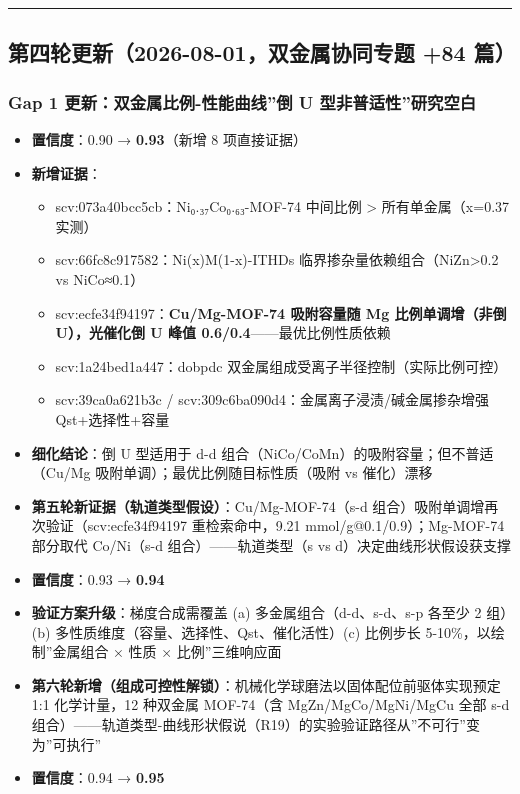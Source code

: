 \documentclass[12pt,a4paper]{ctexart}
\providecommand{\tightlist}{%
  \setlength{\itemsep}{0pt}\setlength{\parskip}{0pt}}
\begin{document}
\begin{center}\rule{0.5\linewidth}{0.5pt}\end{center}

\subsection{第四轮更新（2026-08-01，双金属协同专题 +84 篇）}\label{gap:ux7b2cux56dbux8f6eux66f4ux65b02026-08-01ux53ccux91d1ux5c5eux534fux540cux4e13ux9898-84-ux7bc7}

\subsubsection{Gap 1 更新：双金属比例-性能曲线''倒 U 型非普适性''研究空白}\label{gap:gap-1-ux66f4ux65b0ux53ccux91d1ux5c5eux6bd4ux4f8b-ux6027ux80fdux66f2ux7ebfux5012-u-ux578bux975eux666eux9002ux6027ux7814ux7a76ux7a7aux767d}

\begin{itemize}
\tightlist
\item
  \textbf{置信度}：0.90 → \textbf{0.93}（新增 8 项直接证据）
\item
  \textbf{新增证据}：

  \begin{itemize}
  \tightlist
  \item
    scv:073a40bcc5cb：Ni₀.₃₇Co₀.₆₃-MOF-74 中间比例 \textgreater{} 所有单金属（x=0.37 实测）
  \item
    scv:66fc8c917582：Ni(x)M(1-x)-ITHDs 临界掺杂量依赖组合（NiZn\textgreater0.2 vs NiCo≈0.1）
  \item
    scv:ecfe34f94197：\textbf{Cu/Mg-MOF-74 吸附容量随 Mg 比例单调增（非倒 U），光催化倒 U 峰值 0.6/0.4}------最优比例性质依赖
  \item
    scv:1a24bed1a447：dobpdc 双金属组成受离子半径控制（实际比例可控）
  \item
    scv:39ca0a621b3c / scv:309c6ba090d4：金属离子浸渍/碱金属掺杂增强 Qst+选择性+容量
  \end{itemize}
\item
  \textbf{细化结论}：倒 U 型适用于 d-d 组合（NiCo/CoMn）的吸附容量；但不普适（Cu/Mg 吸附单调）；最优比例随目标性质（吸附 vs 催化）漂移
\item
  \textbf{第五轮新证据（轨道类型假设）}：Cu/Mg-MOF-74（s-d 组合）吸附单调增再次验证（scv:ecfe34f94197 重检索命中，9.21 mmol/g@0.1/0.9）；Mg-MOF-74 部分取代 Co/Ni（s-d 组合）------轨道类型（s vs d）决定曲线形状假设获支撑
\item
  \textbf{置信度}：0.93 → \textbf{0.94}
\item
  \textbf{验证方案升级}：梯度合成需覆盖 (a) 多金属组合（d-d、s-d、s-p 各至少 2 组）(b) 多性质维度（容量、选择性、Qst、催化活性）(c) 比例步长 5-10\%，以绘制''金属组合 × 性质 × 比例''三维响应面
\item
  \textbf{第六轮新增（组成可控性解锁）}：机械化学球磨法以固体配位前驱体实现预定 1:1 化学计量，12 种双金属 MOF-74（含 MgZn/MgCo/MgNi/MgCu 全部 s-d 组合）------轨道类型-曲线形状假说（R19）的实验验证路径从''不可行''变为''可执行''
\item
  \textbf{置信度}：0.94 → \textbf{0.95}
\end{itemize}
\end{document}
